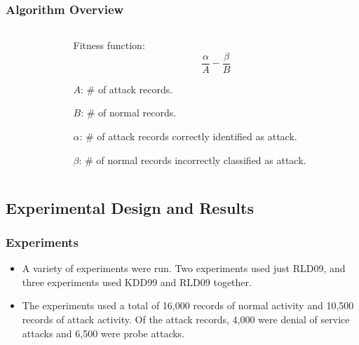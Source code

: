 \documentclass{beamer}
\begin{document}
\begin{frame}
	\frametitle{Algorithm Overview}
\begin{columns}
\begin{column}{0.6\textwidth}
\begin{algorithmic}
    \ENDFOR    
    \ENDIF
  \ENDFOR
  \STATE{find $A$, $B$, $\alpha$, and $\beta$  %
  
  } 
\ENDFOR
{}

\end{algorithmic}
\end{column}

\begin{column}{0.4\textwidth}
	Fitness function:
	\begin{equation*}
	\frac{\alpha}{A} - \frac{\beta}{B}
	\end{equation*}

	$A$: \# of attack records.
	
	$B$: \# of normal records. 

	$\alpha$: \# of attack records correctly identified as attack.

	$\beta$: \# of normal records incorrectly classified as attack.
	
\end{column}
\end{columns}
\end{frame}


\subsection{Experimental Design and Results}

\begin{frame}
	\frametitle{Experiments}
	\begin{itemize}
		\item A variety of experiments were run. Two experiments used just RLD09, and three experiments used KDD99 and RLD09 together.
		\item The experiments used a total of 16,000 records of normal activity and 10,500 records of attack activity. Of the attack records, 4,000 were denial of service attacks and 6,500 were probe attacks.
	\end{itemize}
\end{frame}
\end{document}
